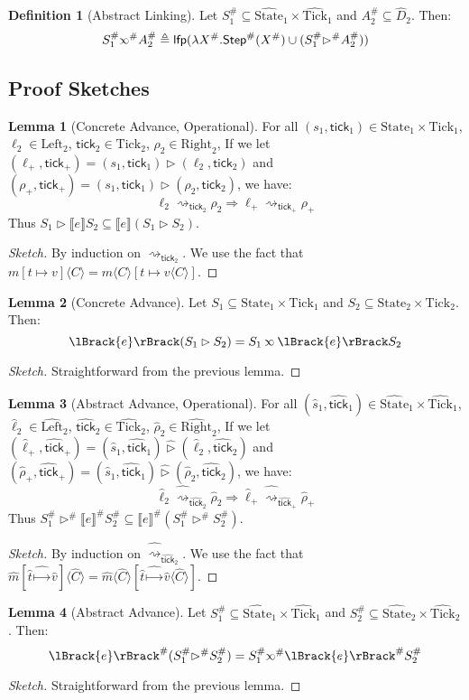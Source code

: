 \documentclass{article}
\theoremstyle{definition}
\newtheorem{definition}{Definition}[section]
\newtheorem{lem}{Lemma}[section]
\newcommand*{\A}[1]{\widehat{#1}}
\newcommand*{\Abs}[1]{{#1}^{\#}}
\newcommand*{\Left}{\text{Left}}
\newcommand*{\Right}{\text{Right}}
\newcommand*{\mem}{m}
\newcommand*{\State}{\text{State}}
\newcommand*{\AState}{\widehat{\text{State}}}
\newcommand*{\Tick}{\text{Tick}}
\newcommand*{\Step}{\mathsf{Step}}
\newcommand*{\semarrow}{\rightsquigarrow}
\newcommand*{\semlink}{\mathbin{\rotatebox[origin=c]{180}{$\propto$}}}
\newcommand*{\sembracket}[1]{\lBrack{#1}\rBrack}
\newcommand*{\tick}{\mathsf{tick}}
\newcommand*{\inject}[2]{{#2}\langle{#1}\rangle}
\begin{document}
\begin{definition}[Abstract Linking]
  Let $\Abs{S}_1\subseteq\A\State_1\times\A\Tick_1$ and $\Abs{A}_2\subseteq \A{D}_2$.
  Then:
  \[
    \Abs{S}_1\Abs\semlink\Abs{A}_2\triangleq
    \mathsf{lfp}(\lambda \Abs{X}.\Abs\Step(\Abs{X})\cup(\Abs{S}_1\Abs\rhd \Abs{A}_2))
  \]
\end{definition}

\subsection{Proof Sketches}
\begin{lem}[Concrete Advance, Operational]
  For all $(s_1,\tick_1)\in\State_1\times\Tick_1$, $\ell_2\in\Left_2$, $\tick_2\in\Tick_2$, $\rho_2\in\Right_2$,
  If we let $(\ell_+,\tick_+)=(s_1,\tick_1)\rhd(\ell_2,\tick_2)$ and $(\rho_+,\tick_+)=(s_1,\tick_1)\rhd(\rho_2,\tick_2)$, we have:
  \[
    \ell_2\semarrow_{\tick_2}\rho_2\Rightarrow\ell_+\semarrow_{\tick_+}\rho_+
  \]
  Thus $S_1\rhd\sembracket{e}S_2\subseteq\sembracket{e}(S_1\rhd S_2)$.
\end{lem}
\begin{proof}[Sketch]
  By induction on $\semarrow_{\tick_2}$.
  We use the fact that $\inject{C}{\mem[t\mapsto v]}=\inject{C}{\mem}[t\mapsto\inject{C}{v}]$.
\end{proof}
\begin{lem}[Concrete Advance]
  Let $S_1\subseteq\State_1\times\Tick_1$ and $S_2\subseteq\State_2\times\Tick_2$. Then:
  \[
    \sembracket{e}(S_1\rhd S_2)=S_1\semlink\sembracket{e}S_2
  \]
\end{lem}
\begin{proof}[Sketch]
  Straightforward from the previous lemma.
\end{proof}
\begin{lem}[Abstract Advance, Operational]
  For all $(\A{s}_1,\A\tick_1)\in\AState_1\times\A\Tick_1$, $\A\ell_2\in\A\Left_2$, $\A\tick_2\in\A\Tick_2$, $\A\rho_2\in\A\Right_2$,
  If we let $(\A\ell_+,\A\tick_+)=(\A{s}_1,\A\tick_1)\A\rhd(\A\ell_2,\A\tick_2)$ and $(\A\rho_+,\A\tick_+)=(\A{s}_1,\A\tick_1)\A\rhd(\A\rho_2,\A\tick_2)$, we have:
  \[
    \A\ell_2\A\semarrow_{\A\tick_2}\A\rho_2\Rightarrow\A\ell_+\A\semarrow_{\A\tick_+}\A\rho_+
  \]
  Thus $\Abs{S}_1\Abs\rhd\Abs{\sembracket{e}}\Abs{S}_2\subseteq\Abs{\sembracket{e}}(\Abs{S}_1\Abs\rhd \Abs{S}_2)$.
\end{lem}
\begin{proof}[Sketch]
  By induction on $\A\semarrow_{\A\tick_2}$.
  We use the fact that $\inject{\A{C}}{\A\mem[\A{t}\A\mapsto\A{v}]}=\inject{\A{C}}{\A\mem}[\A{t}\A\mapsto\inject{\A{C}}{\A{v}}]$.
\end{proof}
\begin{lem}[Abstract Advance]
  Let $\Abs{S}_1\subseteq\AState_1\times\A\Tick_1$ and $\Abs{S}_2\subseteq\AState_2\times\A\Tick_2$. Then:
  \[
    \Abs{\sembracket{e}}(\Abs{S}_1\Abs\rhd\Abs{S}_2)=\Abs{S}_1\Abs\semlink\Abs{\sembracket{e}}\Abs{S}_2
  \]
\end{lem}
\begin{proof}[Sketch]
  Straightforward from the previous lemma.
\end{proof}
\end{document}
